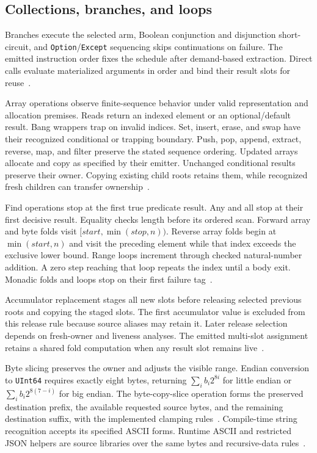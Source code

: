 \documentclass[11pt]{article}
\newcommand{\code}[1]{\texttt{#1}}
\begin{document}
\subsection{Collections, branches, and loops}

Branches execute the selected arm, Boolean conjunction and disjunction short-circuit, and \code{Option}/\code{Except} sequencing skips continuations on failure.  The emitted instruction order fixes the schedule after demand-based extraction.  Direct calls evaluate materialized arguments in order and bind their result slots for reuse~\cite{extract,binary}.

Array operations observe finite-sequence behavior under valid representation and allocation premises.  Reads return an indexed element or an optional/default result.  Bang wrappers trap on invalid indices.  Set, insert, erase, and swap have their recognized conditional or trapping boundary.  Push, pop, append, extract, reverse, map, and filter preserve the stated sequence ordering.  Updated arrays allocate and copy as specified by their emitter.  Unchanged conditional results preserve their owner.  Copying existing child roots retains them, while recognized fresh children can transfer ownership~\cite{values,binary}.

Find operations stop at the first true predicate result.  Any and all stop at their first decisive result.  Equality checks length before its ordered scan.  Forward array and byte folds visit $[\mathit{start},\min(\mathit{stop},n))$.  Reverse array folds begin at $\min(\mathit{start},n)$ and visit the preceding element while that index exceeds the exclusive lower bound.  Range loops increment through checked natural-number addition.  A zero step reaching that loop repeats the index until a body exit.  Monadic folds and loops stop on their first failure tag~\cite{binary}.

Accumulator replacement stages all new slots before releasing selected previous roots and copying the staged slots.  The first accumulator value is excluded from this release rule because source aliases may retain it.  Later release selection depends on fresh-owner and liveness analyses.  The emitted multi-slot assignment retains a shared fold computation when any result slot remains live~\cite{values,binary}.

Byte slicing preserves the owner and adjusts the visible range.  Endian conversion to \code{UInt64} requires exactly eight bytes, returning $\sum_i b_i2^{8i}$ for little endian or $\sum_i b_i2^{8(7-i)}$ for big endian.  The byte-copy-slice operation forms the preserved destination prefix, the available requested source bytes, and the remaining destination suffix, with the implemented clamping rules~\cite{values,binary}.  Compile-time string recognition accepts its specified ASCII forms.  Runtime ASCII and restricted JSON helpers are source libraries over the same bytes and recursive-data rules~\cite{specification}.
\end{document}
